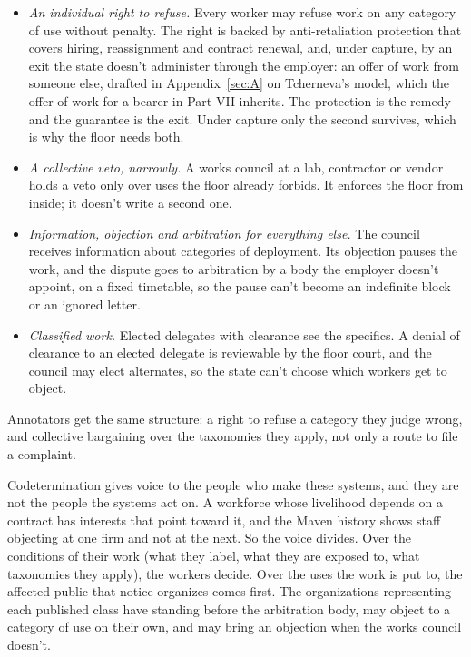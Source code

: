 \begin{itemize}
\item \emph{An individual right to refuse.} Every worker may refuse work on any category of use without penalty. The right is backed by anti-retaliation protection that covers hiring, reassignment and contract renewal, and, under capture, by an exit the state doesn't administer through the employer: an offer of work from someone else, drafted in Appendix~\ref{sec:A} on Tcherneva's model, which the offer of work for a bearer in Part VII inherits. The protection is the remedy and the guarantee is the exit. Under capture only the second survives, which is why the floor needs both.
\item \emph{A collective veto, narrowly.} A works council at a lab, contractor or vendor holds a veto only over uses the floor already forbids. It enforces the floor from inside; it doesn't write a second one.
\item \emph{Information, objection and arbitration for everything else.} The council receives information about categories of deployment. Its objection pauses the work, and the dispute goes to arbitration by a body the employer doesn't appoint, on a fixed timetable, so the pause can't become an indefinite block or an ignored letter.
\item \emph{Classified work.} Elected delegates with clearance see the specifics. A denial of clearance to an elected delegate is reviewable by the floor court, and the council may elect alternates, so the state can't choose which workers get to object.
\end{itemize}

Annotators get the same structure: a right to refuse a category they judge wrong, and collective bargaining over the taxonomies they apply, not only a route to file a complaint.

Codetermination gives voice to the people who make these systems, and they are not the people the systems act on. A workforce whose livelihood depends on a contract has interests that point toward it, and the Maven history shows staff objecting at one firm and not at the next. So the voice divides. Over the conditions of their work (what they label, what they are exposed to, what taxonomies they apply), the workers decide. Over the uses the work is put to, the affected public that notice organizes comes first. The organizations representing each published class have standing before the arbitration body, may object to a category of use on their own, and may bring an objection when the works council doesn't.
